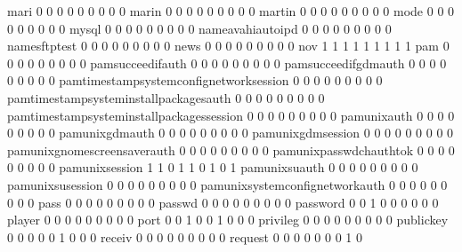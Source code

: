\documentclass[compress,8pt]{beamer}
\begin{document}
\begin{frame}
\begin{Schunk}
  mari                                       0   0   0   0   0   0   0   0   0
  marin                                      0   0   0   0   0   0   0   0   0
  martin                                     0   0   0   0   0   0   0   0   0
  mode                                       0   0   0   0   0   0   0   0   0
  mysql                                      0   0   0   0   0   0   0   0   0
  nameavahiautoipd                           0   0   0   0   0   0   0   0   0
  namesftptest                               0   0   0   0   0   0   0   0   0
  news                                       0   0   0   0   0   0   0   0   0
  nov                                        1   1   1   1   1   1   1   1   1
  pam                                        0   0   0   0   0   0   0   0   0
  pamsucceedifauth                           0   0   0   0   0   0   0   0   0
  pamsucceedifgdmauth                        0   0   0   0   0   0   0   0   0
  pamtimestampsystemconfignetworksession     0   0   0   0   0   0   0   0   0
  pamtimestampsysteminstallpackagesauth      0   0   0   0   0   0   0   0   0
  pamtimestampsysteminstallpackagessession   0   0   0   0   0   0   0   0   0
  pamunixauth                                0   0   0   0   0   0   0   0   0
  pamunixgdmauth                             0   0   0   0   0   0   0   0   0
  pamunixgdmsession                          0   0   0   0   0   0   0   0   0
  pamunixgnomescreensaverauth                0   0   0   0   0   0   0   0   0
  pamunixpasswdchauthtok                     0   0   0   0   0   0   0   0   0
  pamunixsession                             1   1   0   1   1   0   1   0   1
  pamunixsuauth                              0   0   0   0   0   0   0   0   0
  pamunixsusession                           0   0   0   0   0   0   0   0   0
  pamunixsystemconfignetworkauth             0   0   0   0   0   0   0   0   0
  pass                                       0   0   0   0   0   0   0   0   0
  passwd                                     0   0   0   0   0   0   0   0   0
  password                                   0   0   1   0   0   0   0   0   0
  player                                     0   0   0   0   0   0   0   0   0
  port                                       0   0   1   0   0   1   0   0   0
  privileg                                   0   0   0   0   0   0   0   0   0
  publickey                                  0   0   0   0   0   1   0   0   0
  receiv                                     0   0   0   0   0   0   0   0   0
  request                                    0   0   0   0   0   0   0   1   0

\end{Schunk}
\end{frame}
\end{document}
